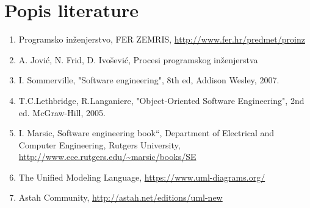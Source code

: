 \chapter*{Popis literature}
		
		\begin{enumerate}
			
			
			\item  Programsko inženjerstvo, FER ZEMRIS, \url{http://www.fer.hr/predmet/proinz}

			\item A. Jović, N. Frid, D. Ivošević, Procesi programskog inženjerstva
			
			\item  I. Sommerville, "Software engineering", 8th ed, Addison Wesley, 2007.
			
			\item  T.C.Lethbridge, R.Langaniere, "Object-Oriented Software Engineering", 2nd ed. McGraw-Hill, 2005.
			
			\item  I. Marsic, Software engineering book``, Department of Electrical and Computer Engineering, Rutgers University, \url{http://www.ece.rutgers.edu/~marsic/books/SE}
			
			\item  The Unified Modeling Language, \url{https://www.uml-diagrams.org/}
			
			\item  Astah Community, \url{http://astah.net/editions/uml-new}
		\end{enumerate}
		
		 
